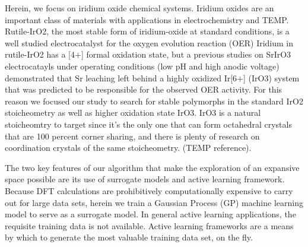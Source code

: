 Herein, we focus on iridium oxide chemical systems.
%
Iridium oxides are an important class of materials with applications in electrochemistry and TEMP.
%
Rutile-IrO2, the most stable form of iridium-oxide at standard conditions, is a well studied electrocatalyst for the oxygen evolution reaction (OER)
Iridium in rutile-IrO2 has a [4+] formal oxidation state, but a previous studies on SrIrO3 electrocatayls  under operating conditions (low pH and high anodic voltage) demonstrated that Sr leaching left behind a highly oxidized Ir[6+] (IrO3) system that was predicted to be responsible for the observed OER activity.
%
For this reason we focused our study to search for stable polymorphs in the standard IrO2 stoicheometry  as well as higher oxidation state IrO3.
IrO3 is a natural stoicheomtry to target since it's the only one that can form octahedral crystals that are 100 percent corner sharing, and there is plenty of research on coordination crystals of the same stoicheometry. (TEMP reference).



The two key features of our algorithm that make the exploration of an expansive space possible are its use of surrogate models and active learning framework.
%
Because DFT calculations are prohibitively computationally expensive to carry out for large data sets, herein we train a Gaussian Process (GP) machine learning model to serve as a surrogate model.
%
In general active learning applications, the requisite training data is not available.
%
Active learning frameworks are a means by which to generate the most valuable training data set, on the fly.


